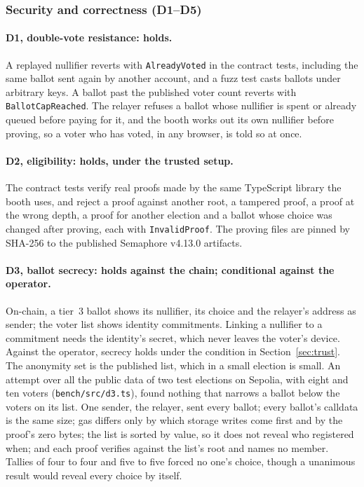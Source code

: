 \subsubsection{Security and correctness (D1--D5)}

\paragraph{D1, double-vote resistance: holds.}
A replayed nullifier reverts with \texttt{AlreadyVoted} in the contract tests,
including the same ballot sent again by another account, and a fuzz
test casts ballots under arbitrary keys. A ballot past the published voter
count reverts with \texttt{BallotCapReached}. The relayer refuses a ballot
whose nullifier is spent or already queued before paying for it, and the booth
works out its own nullifier before proving, so a voter who has voted, in any
browser, is told so at once.

\paragraph{D2, eligibility: holds, under the trusted setup.}
The contract tests verify real proofs made by the same TypeScript library the
booth uses, and reject a proof against another root, a tampered proof, a proof
at the wrong depth, a proof for another election and a ballot whose choice was
changed after proving, each with \texttt{InvalidProof}. The proving files are
pinned by SHA-256 to the published Semaphore v4.13.0 artifacts.

\paragraph{D3, ballot secrecy: holds against the chain; conditional against
the operator.}
On-chain, a tier~3 ballot shows its nullifier, its choice and the relayer's
address as sender; the voter list shows identity commitments. Linking a
nullifier to a commitment needs the identity's secret, which never leaves the
voter's device. Against the operator, secrecy holds under the condition in
Section~\ref{sec:trust}. The anonymity set is the published list, which in a
small election is small. An attempt over all the public data of two test
elections on Sepolia, with eight and ten voters (\texttt{bench/src/d3.ts}),
found nothing that narrows a ballot below the voters on its list. One sender,
the relayer, sent every ballot; every ballot's calldata is the same size; gas
differs only by which storage writes come first and by the proof's zero bytes;
the list is sorted by value, so it does not reveal who registered when; and
each proof verifies against the list's root and names no member. Tallies of
four to four and five to five forced no one's choice, though a unanimous
result would reveal every choice by itself.

